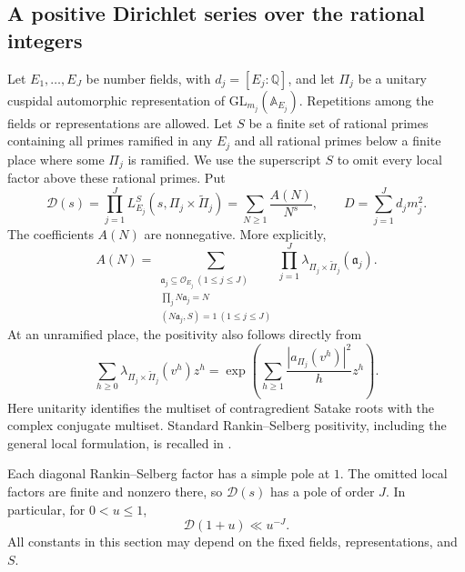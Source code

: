 \documentclass[11pt,reqno]{amsart}
\numberwithin{equation}{section}
\theoremstyle{definition}
\theoremstyle{remark}
\newcommand{\Q}{\mathbb Q}
\begin{document}
\subsection{A positive Dirichlet series over the rational integers}

Let $E_1,\ldots,E_J$ be number fields, with $d_j=[E_j:\Q]$, and let $\Pi_j$ be a unitary cuspidal automorphic representation of $\mathrm{GL}_{m_j}(\mathbb A_{E_j})$. Repetitions among the fields or representations are allowed. Let $S$ be a finite set of rational primes containing all primes ramified in any $E_j$ and all rational primes below a finite place where some $\Pi_j$ is ramified. We use the superscript $S$ to omit every local factor above these rational primes. Put
\begin{equation}\label{ns:positive-series}
\mathcal D(s)=\prod_{j=1}^{J}L_{E_j}^{S}(s,\Pi_j\times\widetilde\Pi_j)
             =\sum_{N\ge1}\frac{A(N)}{N^s},
\qquad D=\sum_{j=1}^{J}d_jm_j^2.
\end{equation}
The coefficients $A(N)$ are nonnegative. More explicitly,
\begin{equation}\label{ns:coeff-convolution}
A(N)=\sum_{\substack{\mathfrak a_j\subseteq\mathcal O_{E_j}\ (1\le j\le J)\\
                    \prod_jN\mathfrak a_j=N\\
                    (N\mathfrak a_j,S)=1\ (1\le j\le J)}}
       \prod_{j=1}^{J}\lambda_{\Pi_j\times\widetilde\Pi_j}(\mathfrak a_j).
\end{equation}
At an unramified place, the positivity also follows directly from
\begin{equation}\label{ns:positive-local-exp}
\sum_{h\ge0}\lambda_{\Pi_j\times\widetilde\Pi_j}(v^h)z^h
 =\exp\left(\sum_{h\ge1}\frac{|a_{\Pi_j}(v^h)|^2}{h}z^h\right).
\end{equation}
Here unitarity identifies the multiset of contragredient Satake roots with the complex conjugate multiset. Standard Rankin--Selberg positivity, including the general local formulation, is recalled in \cite[\S3.4]{HT}.

Each diagonal Rankin--Selberg factor has a simple pole at $1$. The omitted local factors are finite and nonzero there, so $\mathcal D(s)$ has a pole of order $J$. In particular, for $0<u\le1$,
\begin{equation}\label{ns:pole-bound}
\mathcal D(1+u)\ll u^{-J}.
\end{equation}
All constants in this section may depend on the fixed fields, representations, and $S$.
\end{document}
